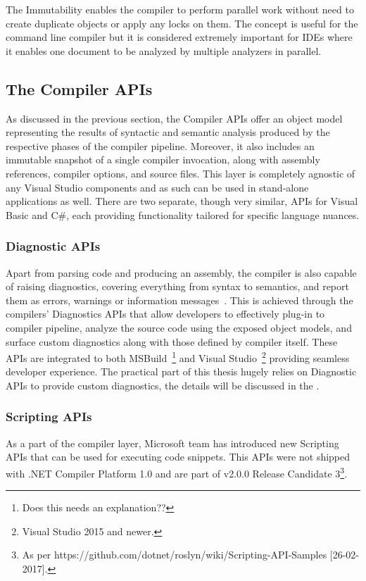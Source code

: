 \documentclass[
  digital, %
  table,   %
  lof,     %
  lot,     %
  oneside,
]{fithesis3}
\begin{document}
The Immutability enables the compiler to perform parallel work without need to create duplicate objects or apply any locks on them. The concept is useful for the command line compiler but it is considered extremely important for IDEs where it enables one document to be analyzed by multiple analyzers in parallel.

  \subsection{The Compiler APIs}
As discussed in the previous section, the Compiler APIs offer an object model representing the results of syntactic and semantic analysis produced by the respective phases of the compiler pipeline. Moreover, it also includes an immutable snapshot of a single compiler invocation, along with assembly references, compiler options, and source files. This layer is completely agnostic of any Visual Studio components and as such can be used in stand-alone applications as well. There are two separate, though very similar, APIs for Visual Basic and C\#, each providing functionality tailored for specific language nuances.

  \subsubsection{Diagnostic APIs}
Apart from parsing code and producing an assembly, the compiler is also capable of raising diagnostics, covering everything from syntax to semantics, and report them as errors, warnings or information messages~\cite{roslyn-succinctly}. This is achieved through the compilers' Diagnostics APIs that allow developers to effectively plug-in to compiler pipeline, analyze the source code using the exposed object models, and surface custom diagnostics along with those defined by compiler itself. These APIs are integrated to both MSBuild~\footnote{Does this needs an explanation??} and Visual Studio~\footnote{Visual Studio 2015 and newer.} providing seamless developer experience. The practical part of this thesis hugely relies on Diagnostic APIs to provide custom diagnostics, the details will be discussed in the \pageref{chap:custom-roslyn-analyzers}.

  \subsubsection{Scripting APIs}
As a part of the compiler layer, Microsoft team has introduced new Scripting APIs that can be used for executing code snippets. This APIs were not shipped with .NET Compiler Platform 1.0 and are part of v2.0.0 Release Candidate 3\footnote{As per https://github.com/dotnet/roslyn/wiki/Scripting-API-Samples [26-02-2017].}.
\end{document}
